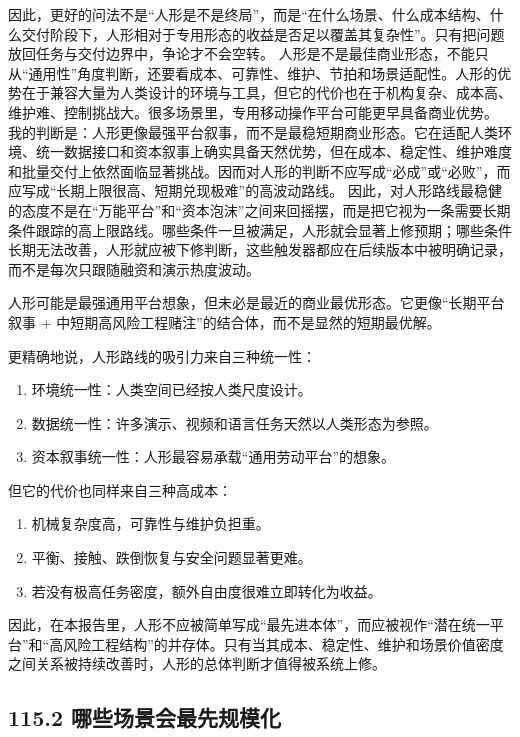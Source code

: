 因此，更好的问法不是“人形是不是终局”，而是“在什么场景、什么成本结构、什么交付阶段下，人形相对于专用形态的收益是否足以覆盖其复杂性”。只有把问题放回任务与交付边界中，争论才不会空转。 人形是不是最佳商业形态，不能只从“通用性”角度判断，还要看成本、可靠性、维护、节拍和场景适配性。人形的优势在于兼容大量为人类设计的环境与工具，但它的代价也在于机构复杂、成本高、维护难、控制挑战大。很多场景里，专用移动操作平台可能更早具备商业优势。 我的判断是：人形更像最强平台叙事，而不是最稳短期商业形态。它在适配人类环境、统一数据接口和资本叙事上确实具备天然优势，但在成本、稳定性、维护难度和批量交付上依然面临显著挑战。因而对人形的判断不应写成“必成”或“必败”，而应写成“长期上限很高、短期兑现极难”的高波动路线。 因此，对人形路线最稳健的态度不是在“万能平台”和“资本泡沫”之间来回摇摆，而是把它视为一条需要长期条件跟踪的高上限路线。哪些条件一旦被满足，人形就会显著上修预期；哪些条件长期无法改善，人形就应被下修判断，这些触发器都应在后续版本中被明确记录，而不是每次只跟随融资和演示热度波动。

人形可能是最强通用平台想象，但未必是最近的商业最优形态。它更像“长期平台叙事 + 中短期高风险工程赌注”的结合体，而不是显然的短期最优解。

更精确地说，人形路线的吸引力来自三种统一性：

\begin{enumerate}
\item 环境统一性：人类空间已经按人类尺度设计。
\item 数据统一性：许多演示、视频和语言任务天然以人类形态为参照。
\item 资本叙事统一性：人形最容易承载“通用劳动平台”的想象。
\end{enumerate}

但它的代价也同样来自三种高成本：

\begin{enumerate}
\item 机械复杂度高，可靠性与维护负担重。
\item 平衡、接触、跌倒恢复与安全问题显著更难。
\item 若没有极高任务密度，额外自由度很难立即转化为收益。
\end{enumerate}

因此，在本报告里，人形不应被简单写成“最先进本体”，而应被视作“潜在统一平台”和“高风险工程结构”的并存体。只有当其成本、稳定性、维护和场景价值密度之间关系被持续改善时，人形的总体判断才值得被系统上修。

\subsection*{115.2 哪些场景会最先规模化}


